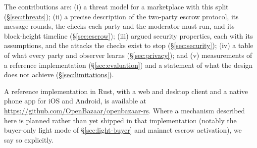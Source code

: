 The contributions are: (i) a threat model for a marketplace with this split (\S\ref{sec:threats}); (ii) a precise description of the two-party escrow protocol, its message rounds, the checks each party and the moderator must run, and its block-height timeline (\S\ref{sec:escrow}); (iii) argued security properties, each with its assumptions, and the attacks the checks exist to stop (\S\ref{sec:security}); (iv) a table of what every party and observer learns (\S\ref{sec:privacy}); and (v) measurements of a reference implementation (\S\ref{sec:evaluation}) and a statement of what the design does not achieve (\S\ref{sec:limitations}).

A reference implementation in Rust, with a web and desktop client and a native phone app for iOS and Android, is available at \url{https://github.com/OpenBazaar/openbazaar-rs}. Where a mechanism described here is planned rather than yet shipped in that implementation (notably the buyer-only light mode of \S\ref{sec:light-buyer} and mainnet escrow activation), we say so explicitly.
